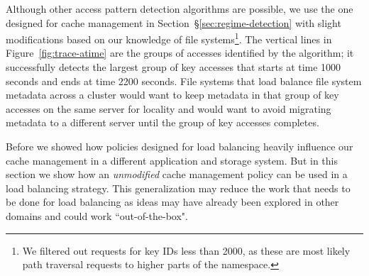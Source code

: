 Although other access pattern detection algorithms are possible, we use the one
designed for cache management in Section~\S\ref{sec:regime-detection} with
slight modifications based on our knowledge of file systems\footnote{We
filtered out requests for key IDs less than 2000, as these are most likely path
traversal requests to higher parts of the namespace.}. The vertical lines in
Figure~\ref{fig:trace-atime} are the groups of accesses identified by the
algorithm; it successfully detects the largest group of key accesses that
starts at time 1000 seconds and ends at time 2200 seconds. File systems that
load balance file system metadata across a cluster would want to keep metadata
in that group of key accesses on the same server for locality and would want to
avoid migrating metadata to a different server until the group of key accesses
completes.

Before we showed how policies designed for load balancing heavily influence our
cache management in a different application and storage system. But in this
section we show how an {\it unmodified} cache management policy can be used in
a load balancing strategy.  This generalization may reduce the work that needs to
be done for load balancing as ideas may have already been explored in other
domains and could work ``out-of-the-box". 

